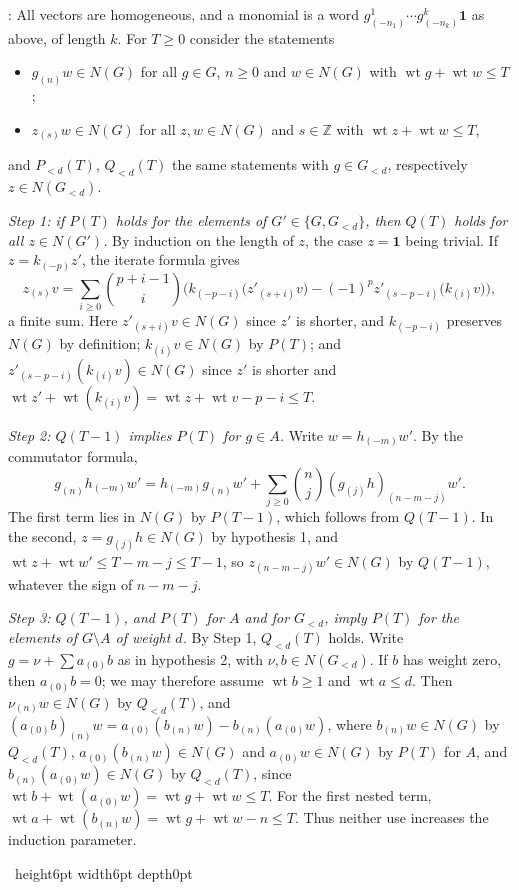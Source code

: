 \documentclass[leqno]{article}
\newcommand{\Z}{\ensuremath{\mathbb{Z}}}
\renewcommand{\leq}{\ensuremath{\leqslant}}
\renewcommand{\geq}{\ensuremath{\geqslant}}
\newcommand{\qed}{\hfill \vrule height6pt  width6pt depth0pt}
\newenvironment{proof}[1][]{\noindent {\it Proof #1} : }{\hbox{~}\qed
\smallskip
}
\numberwithin{equation}{section}
\begin{document}
\begin{proof}
All vectors are homogeneous, and a monomial is a word $g^1_{(-n_1)}\cdots g^k_{(-n_k)}\mathbf 1$ as above, of length $k$. For $T \geq 0$ consider the statements
\begin{itemize}
\item[$P(T)$:] $g_{(n)}w \in N(G)$ for all $g \in G$, $n \geq 0$ and $w \in N(G)$ with $\operatorname{wt}g + \operatorname{wt}w \leq T$;
\item[$Q(T)$:] $z_{(s)}w \in N(G)$ for all $z, w \in N(G)$ and $s \in \Z$ with $\operatorname{wt}z + \operatorname{wt}w \leq T$,
\end{itemize}
and $P_{<d}(T)$, $Q_{<d}(T)$ the same statements with $g \in G_{<d}$, respectively $z \in N(G_{<d})$.

\emph{Step 1: if $P(T)$ holds for the elements of $G' \in \{G, G_{<d}\}$, then $Q(T)$ holds for all $z \in N(G')$.} By induction on the length of $z$, the case $z = \mathbf 1$ being trivial. If $z = k_{(-p)}z'$, the iterate formula gives
\[
z_{(s)}v = \sum_{i \geq 0}\binom{p+i-1}{i}\Big(k_{(-p-i)}\big(z'_{(s+i)}v\big) - (-1)^p z'_{(s-p-i)}\big(k_{(i)}v\big)\Big),
\]
a finite sum. Here $z'_{(s+i)}v \in N(G)$ since $z'$ is shorter, and $k_{(-p-i)}$ preserves $N(G)$ by definition; $k_{(i)}v \in N(G)$ by $P(T)$; and $z'_{(s-p-i)}(k_{(i)}v) \in N(G)$ since $z'$ is shorter and $\operatorname{wt}z' + \operatorname{wt}(k_{(i)}v) = \operatorname{wt}z + \operatorname{wt}v - p - i \leq T$.

\emph{Step 2: $Q(T-1)$ implies $P(T)$ for $g \in A$.} Write $w = h_{(-m)}w'$. By the commutator formula,
\[
g_{(n)}h_{(-m)}w' = h_{(-m)}g_{(n)}w' + \sum_{j \geq 0}\binom{n}{j}(g_{(j)}h)_{(n-m-j)}w'.
\]
The first term lies in $N(G)$ by $P(T-1)$, which follows from $Q(T-1)$. In the second, $z = g_{(j)}h \in N(G)$ by hypothesis 1, and $\operatorname{wt}z + \operatorname{wt}w' \leq T - m - j \leq T - 1$, so $z_{(n-m-j)}w' \in N(G)$ by $Q(T-1)$, whatever the sign of $n - m - j$.

\emph{Step 3: $Q(T-1)$, and $P(T)$ for $A$ and for $G_{<d}$, imply $P(T)$ for the elements of $G \setminus A$ of weight $d$.} By Step 1, $Q_{<d}(T)$ holds. Write $g = \nu + \sum a_{(0)}b$ as in hypothesis 2, with $\nu, b \in N(G_{<d})$. If $b$ has weight zero, then $a_{(0)}b = 0$; we may therefore assume $\operatorname{wt}b \geq 1$ and $\operatorname{wt}a \leq d$. Then $\nu_{(n)}w \in N(G)$ by $Q_{<d}(T)$, and $(a_{(0)}b)_{(n)}w = a_{(0)}(b_{(n)}w) - b_{(n)}(a_{(0)}w)$, where $b_{(n)}w \in N(G)$ by $Q_{<d}(T)$, $a_{(0)}(b_{(n)}w) \in N(G)$ and $a_{(0)}w \in N(G)$ by $P(T)$ for $A$, and $b_{(n)}(a_{(0)}w) \in N(G)$ by $Q_{<d}(T)$, since $\operatorname{wt}b + \operatorname{wt}(a_{(0)}w) = \operatorname{wt}g + \operatorname{wt}w \leq T$. For the first nested term, $\operatorname{wt}a + \operatorname{wt}(b_{(n)}w) = \operatorname{wt}g + \operatorname{wt}w - n \leq T$. Thus neither use increases the induction parameter.


\end{proof}
\end{document}
